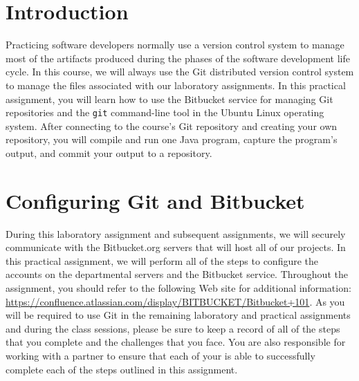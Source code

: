 


\usepackage[compact]{titlesec}



% 

\section*{Introduction}

Practicing software developers normally use a version control system to manage most of the artifacts produced during the
phases of the software development life cycle.  In this course, we will always use the Git distributed version control
system to manage the files associated with our laboratory assignments.  In this practical assignment, you will learn how
to use the Bitbucket service for managing Git repositories and the {\tt git} command-line tool in the Ubuntu Linux
operating system. After connecting to the course's Git repository and creating your own repository, you will compile and
run one Java program, capture the program's output, and commit your output to a repository.

\section*{Configuring Git and Bitbucket}

During this laboratory assignment and subsequent assignments, we will securely communicate with the Bitbucket.org
servers that will host all of our projects.  In this practical assignment, we will perform all of the steps to configure
the accounts on the departmental servers and the Bitbucket service.  Throughout the assignment, you should refer to the
following Web site for additional information: \url{https://confluence.atlassian.com/display/BITBUCKET/Bitbucket+101}.
As you will be required to use Git in the remaining laboratory and practical assignments and during the class sessions,
please be sure to keep a record of all of the steps that you complete and the challenges that you face.  You are also
responsible for working with a partner to ensure that each of your is able to successfully complete each of the steps
outlined in this assignment.

